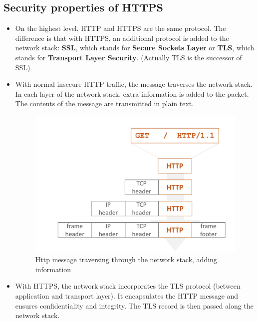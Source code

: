 \documentclass[../main.tex]{subfiles}
\begin{document}
\subsection{Security properties of HTTPS}
\begin{itemize}
\item On the highest level, HTTP and HTTPS are the same protocol. The difference is that with HTTPS, an additional protocol is added to the network stack:  \textbf{SSL}, which stands for \textbf{Secure Sockets Layer} or \textbf{TLS}, which stands for \textbf{Transport Layer Security}. (Actually TLS is the successor of SSL)
\item With normal insecure HTTP traffic, the message traverses the network stack. In each layer of the network stack, extra information is added to the packet. The contents of the message are transmitted in plain text.
\begin{figure}[h!]
\includegraphics[width=\textwidth]{../images/http}
\caption{Http message traversing through the network stack, adding information}
\end{figure}
\item With HTTPS, the network stack incorporates the TLS protocol (between application and transport layer). It encapsulates the HTTP message and ensures confidentiality and integrity. The TLS record is then passed along the network stack.
\begin{figure}[h!]

\end{figure}
\end{itemize}
\end{document}
